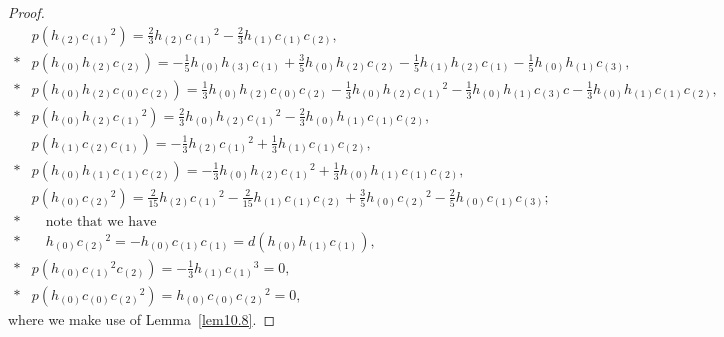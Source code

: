 \documentclass[10pt,a4paper]{amsart}
\begin{document}
\begin{proof}
\begin{align*}
&p(h_{(2)}c_{(1)}{}^2)=\frac23h_{(2)}c_{(1)}{}^2-\frac23h_{(1)}c_{(1)}c_{(2)},\\*
&p(h_{(0)}h_{(2)}c_{(2)})=-\frac15h_{(0)}h_{(3)}c_{(1)}+\frac35h_{(0)}h_{(2)}c_{(2)}-\frac15h_{(1)}h_{(2)}c_{(1)}-\frac15h_{(0)}h_{(1)}c_{(3)},\\*
&p(h_{(0)}h_{(2)}c_{(0)}c_{(2)})=\frac13h_{(0)}h_{(2)}c_{(0)}c_{(2)}-\frac13h_{(0)}h_{(2)}c_{(1)}{}^2-\frac13h_{(0)}h_{(1)}c_{(3)}c-\frac13h_{(0)}h_{(1)}c_{(1)}c_{(2)},\\*
&p(h_{(0)}h_{(2)}c_{(1)}{}^2)=\frac23h_{(0)}h_{(2)}c_{(1)}{}^2-\frac23h_{(0)}h_{(1)}c_{(1)}c_{(2)},\\
&p(h_{(1)}c_{(2)}c_{(1)})=-\frac13h_{(2)}c_{(1)}{}^2+\frac13h_{(1)}c_{(1)}c_{(2)},\\*
&p(h_{(0)}h_{(1)}c_{(1)}c_{(2)})=-\frac13h_{(0)}h_{(2)}c_{(1)}{}^2+\frac13h_{(0)}h_{(1)}c_{(1)}c_{(2)},\\
&p(h_{(0)}c_{(2)}{}^2)=\frac2{15}h_{(2)}c_{(1)}{}^2-\frac2{15}h_{(1)}c_{(1)}c_{(2)}+\frac35h_{(0)}c_{(2)}{}^2-\frac25h_{(0)}c_{(1)}c_{(3)};\\*
&\quad\text{note that we have}\\*
&\quad
h_{(0)}c_{(2)}{}^2=-h_{(0)}c_{(1)}c_{(1)}=d(h_{(0)}h_{(1)}c_{(1)}),\\*
&p(h_{(0)}c_{(1)}{}^2c_{(2)})=-\frac13h_{(1)}c_{(1)}{}^3=0,\\*
&p(h_{(0)}c_{(0)}c_{(2)}{}^2)=h_{(0)}c_{(0)}c_{(2)}{}^2=0,
\end{align*}
where we make use of Lemma~\ref{lem10.8}.


\end{proof}
\end{document}
